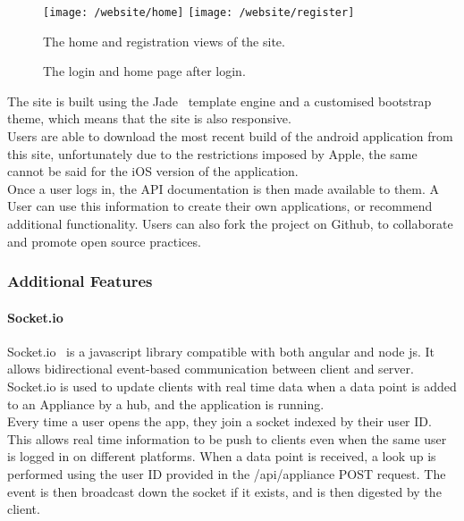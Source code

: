 \documentclass[draft,preprint,12pt,3p]{elsarticle}
\begin{document}
\begin{figure}[H]
    \centering
    \texttt{[image: /website/home]}
    \texttt{[image: /website/register]}
    \caption {The home and registration views of the site.}
\end{figure}
\begin{figure}[H]
    \centering

    \caption {The login and home page after login.}
\end{figure}

The site is built using the Jade~\cite{jade} template engine and a customised bootstrap~\cite{bootstrap} theme, which means that the site is also responsive.\\
Users are able to download the most recent build of the android application from this site, unfortunately due to the restrictions imposed by Apple, the same cannot be said for the iOS version of the application.\\
Once a user logs in, the API documentation is then made available to them. A User can use this information to create their own applications, or recommend additional functionality. Users can also fork the project on Github, to collaborate and promote open source practices.

\subsubsection{Additional Features}

\paragraph{Socket.io}
Socket.io~\cite{socketio} is a javascript library compatible with both angular and node js. It allows bidirectional event-based communication between client and server.\\
Socket.io is used to update clients with real time data when a data point is added to an Appliance by a hub, and the application is running.\\
Every time a user opens the app, they join a socket indexed by their user ID. This allows real time information to be push to clients even when the same user is logged in on different platforms. When a data point is received, a look up is performed using the user ID provided in the /api/appliance POST request. The event is then broadcast down the socket if it exists, and is then digested by the client.
\end{document}
